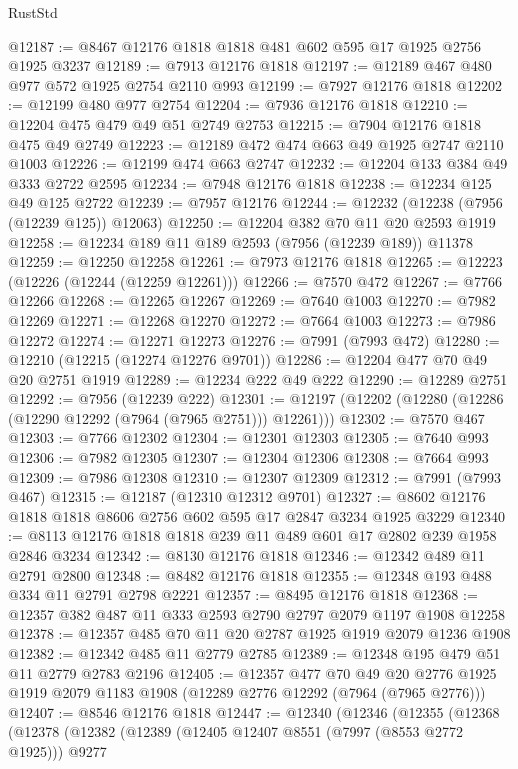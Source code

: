 \begin{lexlean}{RustStd}
\begin{coremodule}
@12187 := @8467 @12176 @1818 @1818 @481 @602 @595 @17 @1925 @2756 @1925 @3237
@12189 := @7913 @12176 @1818
@12197 := @12189 @467 @480 @977 @572 @1925 @2754 @2110 @993
@12199 := @7927 @12176 @1818
@12202 := @12199 @480 @977 @2754
@12204 := @7936 @12176 @1818
@12210 := @12204 @475 @479 @49 @51 @2749 @2753
@12215 := @7904 @12176 @1818 @475 @49 @2749
@12223 := @12189 @472 @474 @663 @49 @1925 @2747 @2110 @1003
@12226 := @12199 @474 @663 @2747
@12232 := @12204 @133 @384 @49 @333 @2722 @2595
@12234 := @7948 @12176 @1818
@12238 := @12234 @125 @49 @125 @2722
@12239 := @7957 @12176
@12244 := @12232 (@12238 (@7956 (@12239 @125)) @12063)
@12250 := @12204 @382 @70 @11 @20 @2593 @1919
@12258 := @12234 @189 @11 @189 @2593 (@7956 (@12239 @189)) @11378
@12259 := @12250 @12258
@12261 := @7973 @12176 @1818
@12265 := @12223 (@12226 (@12244 (@12259 @12261)))
@12266 := @7570 @472
@12267 := @7766 @12266
@12268 := @12265 @12267
@12269 := @7640 @1003
@12270 := @7982 @12269
@12271 := @12268 @12270
@12272 := @7664 @1003
@12273 := @7986 @12272
@12274 := @12271 @12273
@12276 := @7991 (@7993 @472)
@12280 := @12210 (@12215 (@12274 @12276 @9701))
@12286 := @12204 @477 @70 @49 @20 @2751 @1919
@12289 := @12234 @222 @49 @222
@12290 := @12289 @2751
@12292 := @7956 (@12239 @222)
@12301 := @12197 (@12202 (@12280 (@12286 (@12290 @12292 (@7964 (@7965 @2751))) @12261)))
@12302 := @7570 @467
@12303 := @7766 @12302
@12304 := @12301 @12303
@12305 := @7640 @993
@12306 := @7982 @12305
@12307 := @12304 @12306
@12308 := @7664 @993
@12309 := @7986 @12308
@12310 := @12307 @12309
@12312 := @7991 (@7993 @467)
@12315 := @12187 (@12310 @12312 @9701)
@12327 := @8602 @12176 @1818 @1818 @8606 @2756 @602 @595 @17 @2847 @3234 @1925 @3229
@12340 := @8113 @12176 @1818 @1818 @239 @11 @489 @601 @17 @2802 @239 @1958 @2846 @3234
@12342 := @8130 @12176 @1818
@12346 := @12342 @489 @11 @2791 @2800
@12348 := @8482 @12176 @1818
@12355 := @12348 @193 @488 @334 @11 @2791 @2798 @2221
@12357 := @8495 @12176 @1818
@12368 := @12357 @382 @487 @11 @333 @2593 @2790 @2797 @2079 @1197 @1908 @12258
@12378 := @12357 @485 @70 @11 @20 @2787 @1925 @1919 @2079 @1236 @1908
@12382 := @12342 @485 @11 @2779 @2785
@12389 := @12348 @195 @479 @51 @11 @2779 @2783 @2196
@12405 := @12357
    @477
    @70
    @49
    @20
    @2776
    @1925
    @1919
    @2079
    @1183
    @1908
    (@12289 @2776 @12292 (@7964 (@7965 @2776)))
@12407 := @8546 @12176 @1818
@12447 := @12340
    (@12346
      (@12355
        (@12368
          (@12378
            (@12382
              (@12389
                (@12405 @12407 @8551 (@7997 (@8553 @2772 @1925)))
                @9277

\end{coremodule}
\end{lexlean}
